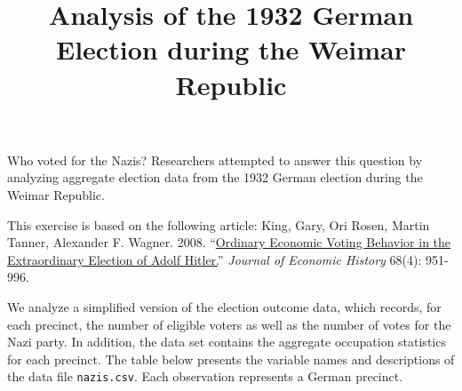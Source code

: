 \documentclass[]{article}
\title{Analysis of the 1932 German Election during the Weimar Republic}
\author{}
\date{}
\begin{document}
\maketitle


Who voted for the Nazis? Researchers attempted to answer this question
by analyzing aggregate election data from the 1932 German election
during the Weimar Republic.

This exercise is based on the following article: King, Gary, Ori Rosen,
Martin Tanner, Alexander F. Wagner. 2008.
``\href{http://dx.doi.org/10.1017/S0022050708000788}{Ordinary Economic
Voting Behavior in the Extraordinary Election of Adolf Hitler.}''
\emph{Journal of Economic History} 68(4): 951-996.

We analyze a simplified version of the election outcome data, which
records, for each precinct, the number of eligible voters as well as the
number of votes for the Nazi party. In addition, the data set contains
the aggregate occupation statistics for each precinct. The table below
presents the variable names and descriptions of the data file
\texttt{nazis.csv}. Each observation represents a German precinct.
\end{document}
